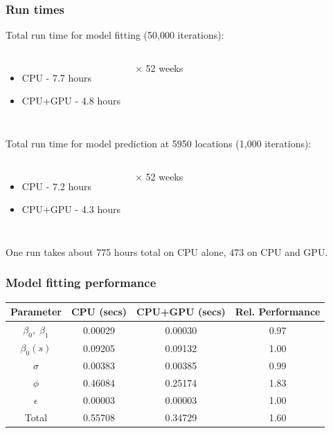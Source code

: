 \documentclass[t]{beamer}\usepackage[]{graphicx}\usepackage[]{color}
\begin{document}
\begin{frame}
\frametitle{Run times}

Total run time for model fitting (50,000 iterations): \\ \vspace{2mm}

\begin{columns}[c]
\begin{itemize}
\item CPU - 7.7 hours
\item CPU+GPU - 4.8 hours
\end{itemize}
$\times$ 52 weeks
\end{columns}


\vfill


Total run time for model prediction at 5950 locations (1,000 iterations): \\ \vspace{2mm}

\begin{columns}[c]
\begin{itemize}
\item CPU - 7.2 hours
\item CPU+GPU - 4.3 hours
\end{itemize}
$\times$ 52 weeks
\end{columns}

\vfill

One run takes about 775 hours total on CPU alone, 473 on CPU and GPU.

\end{frame}


\begin{frame}
\frametitle{Model fitting performance}

\begin{center}
\renewcommand*{\arraystretch}{1.5}
\begin{tabular}{c|c|c|c}
Parameter                 & CPU (secs) & CPU+GPU (secs)  & Rel. Performance \\
\hline           
$\beta_0, \; \beta_1$     & 0.00029    & 0.00030         & 0.97 \\
$\beta_0(s) $             & 0.09205    & 0.09132         & 1.00 \\
$\sigma$                  & 0.00383    & 0.00385         & 0.99 \\
$\phi$                    & 0.46084    & 0.25174         & 1.83 \\
$\epsilon$                & 0.00003    & 0.00003         & 1.00 \\
\hline
Total                     & 0.55708    & 0.34729         & 1.60
\end{tabular}
\end{center}

\end{frame}
\end{document}
